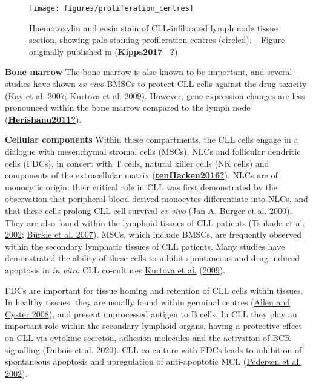 \documentclass[11pt, a4paper, twosided]{book}
\begin{document}
\begin{figure}

{\centering \texttt{[image: figures/proliferation\_centres]} 

}

\caption{Haemotoxylin and eosin stain of CLL-infiltrated lymph node tissue section, showing pale-staining profileration centres (circled). \_Figure originally published in (\protect\hyperlink{ref-Kipps2017_}{\textbf{Kipps2017\_?}}).}\label{fig:proliferationCentres}
\end{figure}
\textbf{Bone marrow}
The bone marrow is also known to be important, and several studies have shown \emph{ex vivo} BMSCs to protect CLL cells against the drug toxicity (\protect\hyperlink{ref-Kay2007}{Kay et al. 2007}; \protect\hyperlink{ref-Kurtova2009}{Kurtova et al. 2009}). However, gene expression changes are less pronounced within the bone marrow compared to the lymph node (\protect\hyperlink{ref-Herishanu2011}{\textbf{Herishanu2011?}}).

\textbf{Cellular components}
Within these compartments, the CLL cells engage in a dialogue with mesenchymal stromal cells (MSCs), NLCs and follicular dendritic cells (FDCs), in concert with T cells, natural killer cells (NK cells) and components of the extracellular matrix (\protect\hyperlink{ref-tenHacken2016}{\textbf{tenHacken2016?}}). NLCs are of monocytic origin: their critical role in CLL was first demonstrated by the observation that peripheral blood-derived monocytes differentiate into NLCs, and that these cells prolong CLL cell survival \emph{ex vivo} (\protect\hyperlink{ref-Burger2000}{Jan A. Burger et al. 2000}). They are also found within the lymphoid tissues of CLL patients (\protect\hyperlink{ref-Tsukada2002}{Tsukada et al. 2002}; \protect\hyperlink{ref-Burkle2007}{Bürkle et al. 2007}). MSCs, which include BMSCs, are frequently observed within the secondary lymphatic tissues of CLL patients. Many studies have demonstrated the ability of these cells to inhibit spontaneous and drug-induced apoptosis in \emph{in vitro} CLL co-cultures \protect\hyperlink{ref-Kurtova2009}{Kurtova et al.} (\protect\hyperlink{ref-Kurtova2009}{2009}).

FDCs are important for tissue homing and retention of CLL cells within tissues. In healthy tissues, they are usually found within germinal centres (\protect\hyperlink{ref-Allen2008}{Allen and Cyster 2008}), and present unprocessed antigen to B cells. In CLL they play an important role within the secondary lymphoid organs, having a protective effect on CLL via cytokine secreton, adhesion molecules and the activation of BCR signalling (\protect\hyperlink{ref-Dubois2020}{Dubois et al. 2020}). CLL co-culture with FDCs leads to inhibition of spontaneous apoptosis and upregulation of anti-apoptotic MCL (\protect\hyperlink{ref-Pedersen2002}{Pedersen et al. 2002}).
\end{document}
